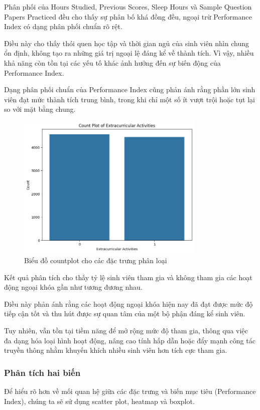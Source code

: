Phân phối của Hours Studied, Previous Scores, Sleep Hours và Sample Question Papers Practiced đều cho thấy sự phân bố khá đồng đều, ngoại trừ Performance Index có dạng phân phối chuẩn rõ rệt.

Điều này cho thấy thói quen học tập và thời gian ngủ của sinh viên nhìn chung ổn định, không tạo ra những giá trị ngoại lệ đáng kể về thành tích. Vì vậy, nhiều khả năng còn tồn tại các yếu tố khác ảnh hưởng đến sự biến động của Performance Index.

Dạng phân phối chuẩn của Performance Index cũng phản ánh rằng phần lớn sinh viên đạt mức thành tích trung bình, trong khi chỉ một số ít vượt trội hoặc tụt lại so với mặt bằng chung.

\begin{figure}[H]
	\centering
	\includegraphics[width=0.8\textwidth]{images/eda/2.png}
	\caption{Biểu đồ countplot cho các đặc trưng phân loại}
\end{figure}

Kết quả phân tích cho thấy tỷ lệ sinh viên tham gia và không tham gia các hoạt động ngoại khóa gần như tương đương nhau.

Điều này phản ánh rằng các hoạt động ngoại khóa hiện nay đã đạt được mức độ tiếp cận tốt và thu hút được sự quan tâm của một bộ phận đáng kể sinh viên.

Tuy nhiên, vẫn tồn tại tiềm năng để mở rộng mức độ tham gia, thông qua việc đa dạng hóa loại hình hoạt động, nâng cao tính hấp dẫn hoặc đẩy mạnh công tác truyền thông nhằm khuyến khích nhiều sinh viên hơn tích cực tham gia.

\subsubsection{Phân tích hai biến}
Để hiểu rõ hơn về mối quan hệ giữa các đặc trưng và biến mục tiêu (Performance Index), chúng ta sẽ sử dụng scatter plot, heatmap và boxplot.

